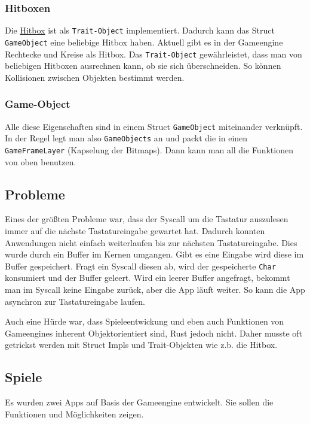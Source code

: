     \subsubsection{Hitboxen}
        Die \underline{Hitbox} ist als \verb|Trait-Object| implementiert. Dadurch kann das Struct \verb|GameObject| eine beliebige Hitbox haben. Aktuell gibt es in der Gameengine Rechtecke und Kreise als Hitbox. Das \verb|Trait-Object| gewährleistet, dass man von beliebigen Hitboxen ausrechnen kann, ob sie sich überschneiden. So können Kollisionen zwischen Objekten bestimmt werden.

    \subsubsection{Game-Object}
        Alle diese Eigenschaften sind in einem Struct \verb|GameObject| miteinander verknüpft. In der Regel legt man also \verb|GameObjects| an und packt die in einen \verb|GameFrameLayer| (Kapselung der Bitmaps). Dann kann man all die Funktionen von oben benutzen.

\subsection{Probleme}
    Eines der größten Probleme war, dass der Syscall um die Tastatur auszulesen immer auf die nächste Tastatureingabe gewartet hat. Dadurch konnten Anwendungen nicht einfach weiterlaufen bis zur nächsten Tastatureingabe. Dies wurde durch ein Buffer im Kernen umgangen. Gibt es eine Eingabe wird diese im Buffer gespeichert. Fragt ein Syscall diesen ab, wird der gespeicherte \verb|Char| konsumiert und der Buffer geleert. Wird ein leerer Buffer angefragt, bekommt man im Syscall keine Eingabe zurück, aber die App läuft weiter. So kann die App asynchron zur Tastatureingabe laufen. \newline

    Auch eine Hürde war, dass Spieleentwickung und eben auch Funktionen von Gameengines inherent Objektorientiert sind, Rust jedoch nicht. Daher musste oft getrickst werden mit Struct Impls und Trait-Objekten wie z.b. die Hitbox.


\subsection{Spiele}
    Es wurden zwei Apps auf Basis der Gameengine entwickelt. Sie sollen die Funktionen und Möglichkeiten zeigen. 


